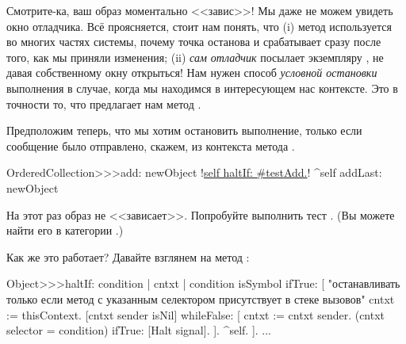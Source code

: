 \documentclass[a4paper,10pt,twoside]{book}
\begin{document}
Смотрите-ка, ваш образ моментально <<завис>>! Мы даже не можем увидеть окно отладчика.
Всё проясняется, стоит нам понять, что (i) метод  используется во многих частях системы, почему точка останова и срабатывает сразу после того, как мы приняли изменения; (ii) \emph{сам отладчик} посылает  экземпляру , не давая собственному окну открыться!
Нам нужен способ \emph{условной остановки} выполнения в случае, когда мы находимся в интересующем нас контексте.
Это в точности то, что предлагает нам метод .

Предположим теперь, что мы хотим остановить выполнение, только если сообщение  было отправлено, скажем, из контекста метода .

\begin{code}{}
OrderedCollection>>>add: newObject
	!\underline{self haltIf: \#testAdd.}!
	^self addLast: newObject
\end{code}

На этот раз образ не <<зависает>>. Попробуйте выполнить тест .
(Вы можете найти его в категории .)

Как же это работает? Давайте взглянем на метод :
\begin{code}{}
Object>>>haltIf: condition
	| cntxt |
	condition isSymbol ifTrue: [
		"останавливать только если метод с указанным селектором присутствует в стеке вызовов"
		cntxt := thisContext.
		[cntxt sender isNil] whileFalse: [
			cntxt := cntxt sender. 
			(cntxt selector = condition) ifTrue: [Halt signal]. ].
		^self.
	].
	...
\end{code}
\end{document}
